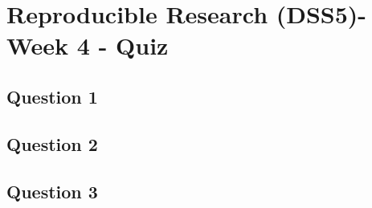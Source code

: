 \documentclass[french]{article}
\begin{document}
\section*{Reproducible Research (DSS5)- Week 4 - Quiz}
\subsection*{Question 1}

\newpage
\subsection*{Question 2}


\newpage
\subsection*{Question 3}
\end{document}
